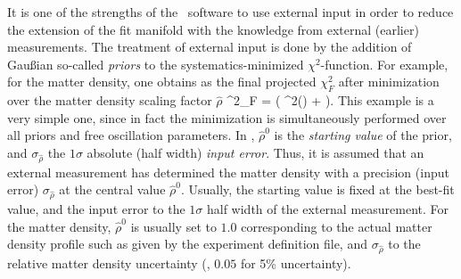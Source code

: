It is one of the strengths of the \GLOBES\ software to use external input 
in order to reduce the extension of the fit manifold with the knowledge 
from external
(earlier) measurements. The treatment of external input is done by the 
addition of Gau\ss ian so-called {\em priors} to the systematics-minimized 
$\chi^2$-function. For example, for the matter density, one obtains as the 
final projected $\chi^2_F$ after minimization over the matter density
scaling factor  $\hat{\rho}$
\be
 \chi^2_F =  \left( \chi^2(\hat{\rho}) +
  \right).
\label{equ:priors}
\ee
This example is a very simple one, since in fact the
minimization is simultaneously performed over all priors and free oscillation 
parameters. In , $\hat{\rho}^0$ is the {\em starting value} of the 
prior, and $\sigma_{\hat{\rho}}$ the $1 \sigma$ absolute (half width) 
{\em input error}. Thus, it is assumed that an external measurement has 
determined the matter density with a precision (input error) 
$\sigma_{\hat{\rho}}$ at the central value $\hat{\rho}^0$. Usually, 
the starting value is fixed at the best-fit value, and the input error 
to the $1 \sigma$ half width of the external measurement. For the matter 
density, $\hat{\rho}^0$  is usually set to $1.0$ corresponding to
the actual matter density profile such as given by the experiment
 definition file, and $\sigma_{\hat{\rho}}$ to the 
relative matter density uncertainty (\eg, $0.05$ for 5\% uncertainty).

